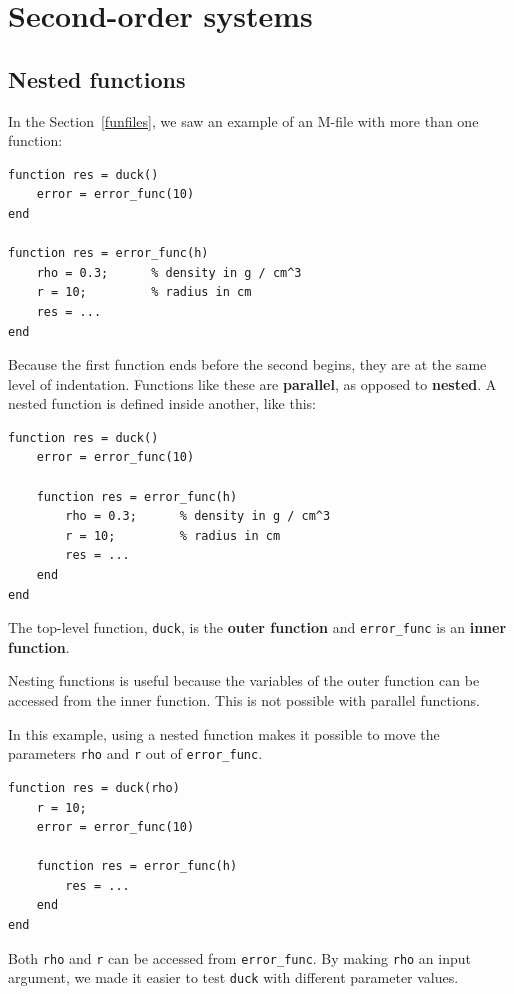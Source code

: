 \documentclass{book}
\begin{document}
\chapter{Second-order systems}


\section{Nested functions}

In the Section~\ref{funfiles}, we saw an example of an M-file with
more than one function:

\begin{verbatim}
function res = duck()
    error = error_func(10)
end

function res = error_func(h)
    rho = 0.3;      % density in g / cm^3
    r = 10;         % radius in cm
    res = ...
end
\end{verbatim}

Because the first function ends before the second begins, they are at
the same level of indentation.  Functions like these are {\bf
parallel}, as opposed to {\bf nested}.  A nested function is
defined inside another, like this:

\begin{verbatim}
function res = duck()
    error = error_func(10)

    function res = error_func(h)
        rho = 0.3;      % density in g / cm^3
        r = 10;         % radius in cm
        res = ...
    end
end
\end{verbatim}

The top-level function, {\tt duck}, is
the {\bf outer function} and {\tt error\_func} is
an {\bf inner function}.

Nesting functions is useful because the variables of the outer
function can be accessed from the inner function.  This is not
possible with parallel functions.

In this example, using a nested function makes it possible to
move the parameters {\tt rho} and {\tt r} out of {\tt error\_func}.

\begin{verbatim}
function res = duck(rho)
    r = 10;
    error = error_func(10)

    function res = error_func(h)
        res = ...
    end
end
\end{verbatim}

Both {\tt rho} and {\tt r} can be accessed from {\tt error\_func}.
By making {\tt rho} an input argument, we made it easier to test
{\tt duck} with different parameter values.
\end{document}
